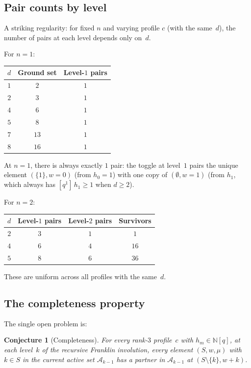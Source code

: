 \documentclass[11pt]{article}
\newcommand{\N}{\mathbb{N}}
\theoremstyle{plain}
\newtheorem{conjecture}[theorem]{Conjecture}
\theoremstyle{definition}
\begin{document}
\subsection{Pair counts by level}

A striking regularity: for fixed $n$ and varying profile
$c$ (with the same~$d$), the number of pairs at each level
depends only on~$d$.

\medskip
For $n = 1$:
\begin{center}
\begin{tabular}{c|c|c}
$d$ & \textbf{Ground set} &
  \textbf{Level-$1$ pairs} \\ \hline
$1$ & $2$ & $1$ \\
$2$ & $3$ & $1$ \\
$4$ & $6$ & $1$ \\
$5$ & $8$ & $1$ \\
$7$ & $13$ & $1$ \\
$8$ & $16$ & $1$
\end{tabular}
\end{center}

\noindent
At $n = 1$, there is always exactly $1$ pair: the toggle
at level~$1$ pairs the unique element $(\{1\}, w{=}0)$
(from $h_0 = 1$) with one copy of $(\emptyset, w{=}1)$
(from $h_1$, which always has $[q^1]\,h_1 \geq 1$
when $d \geq 2$).

\medskip
For $n = 2$:
\begin{center}
\begin{tabular}{c|c|c|c}
$d$ &
  \textbf{Level-$1$ pairs} &
  \textbf{Level-$2$ pairs} &
  \textbf{Survivors} \\ \hline
$2$ & $3$ & $1$ & $1$ \\
$4$ & $6$ & $4$ & $16$ \\
$5$ & $8$ & $6$ & $36$
\end{tabular}
\end{center}

\noindent
These are uniform across all profiles with the same~$d$.


\subsection{The completeness property}

The single open problem is:

\begin{conjecture}[Completeness]
\label{conj:completeness}
For every rank-$3$ profile~$c$ with $h_m \in \N[q]$,
at each level~$k$ of the recursive Franklin involution,
every element $(S, w, \mu)$ with $k \in S$ in the current
active set $\mathcal{A}_{k-1}$ has a partner in
$\mathcal{A}_{k-1}$ at $(S \setminus \{k\}, w + k)$.
\end{conjecture}
\end{document}
